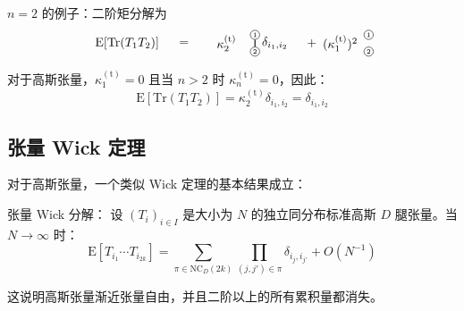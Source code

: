 $n=2$ 的例子：二阶矩分解为
\[
\begin{tikzpicture}[baseline=-.5em, scale=0.8]
   \node at (-1,0) {$\mathrm{E}[\mathrm{Tr}(T_1 T_2)]$};
   \node at (1,0) {$=$};
   
   \node at (2.5,0) {$\kappa_2^{(\mathrm{t})}$};
   \node[circle, draw, inner sep=1pt] (A1) at (3.5,0.3) {\tiny 1};
   \node[circle, draw, inner sep=1pt] (A2) at (3.5,-0.3) {\tiny 2};
   \draw[thick] (A1) -- (A2);
   \node at (4.2,0) {$\delta_{i_1,i_2}$};
   
   \node at (5.5,0) {$+$};
   
   \node at (6.5,0) {$(\kappa_1^{(\mathrm{t})})^2$};
   \node[circle, draw, inner sep=1pt] (B1) at (7.5,0.3) {\tiny 1};
   \node[circle, draw, inner sep=1pt] (B2) at (7.5,-0.3) {\tiny 2};
\end{tikzpicture}
\]

对于高斯张量，$\kappa_1^{(\mathrm{t})} = 0$ 且当 $n > 2$ 时 $\kappa_n^{(\mathrm{t})} = 0$，因此：
\[
   \mathrm{E}[\mathrm{Tr}(T_1 T_2)] = \kappa_2^{(\mathrm{t})} \delta_{i_1,i_2} = \delta_{i_1,i_2}
\]

\subsection{张量 Wick 定理}

对于高斯张量，一个类似 Wick 定理的基本结果成立：

张量 Wick 分解：
设 $(T_i)_{i \in I}$ 是大小为 $N$ 的独立同分布标准高斯 $D$ 腿张量。当 $N \to \infty$ 时：
\[
   \mathrm{E}[T_{i_1} \cdots T_{i_{2k}}] = \sum_{\pi \in \mathrm{NC}_D(2k)} \prod_{(j,j') \in \pi} \delta_{i_j, i_{j'}} + O(N^{-1})
\]

这说明高斯张量渐近张量自由，并且二阶以上的所有累积量都消失。

